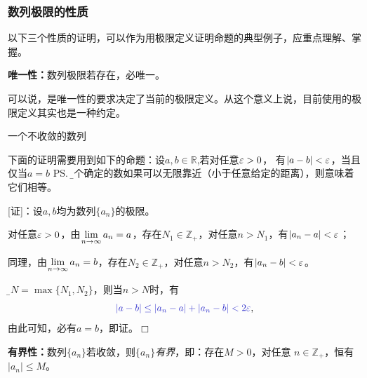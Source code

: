\subsubsection{数列极限的性质}

以下三个性质的证明，可以作为用极限定义证明命题的典型例子，应重点理解、掌握。

\begin{thx}
	{\bf 唯一性：}数列极限若存在，必唯一。
\end{thx}

可以说，是唯一性的要求决定了当前的极限定义。从这个意义上说，目前使用的极限定义其实也是一种约定。

\begin{center}
	
	一个不收敛的数列
\end{center}

下面的证明需要用到如下的命题：设$a,b\in\mathbb{R}$,若对任意$\varepsilon>0$，
有$|a-b|<\varepsilon$，当且仅当$a=b$
\ps{\b 两个确定的数如果可以无限靠近（小于任意给定的距离），则意味着它们相等。}

[证]：设$a,b$均为数列$\{a_n\}$的极限。

对任意$\varepsilon>0$，由$\lim\limits_{n\to\infty} a_n=a$，存在$N_1\in\mathbb{Z}_+$，对任意$n>N_1$，有$|a_n-a|<\varepsilon$；

同理，由$\lim\limits_{n\to\infty} a_n=b$，存在$N_2\in\mathbb{Z}_+$，对任意$n>N_2$，有$|a_n-b|<\varepsilon$。

令{\b $N=\max\{N_1,N_2\}$}，则当$n>N$时，有
$${\b |a-b|\leq|a_n-a|+|a_n-b|<2\e},$$
由此可知，必有$a=b$，即证。\hfill $\Box$

\begin{thx}
	{\bf 有界性：}数列$\{a_n\}$若收敛，则{\it $\{a_n\}$有界}，即：存在$M>0$，对任意
	$n\in\mathbb{Z}_+$，恒有$|a_n|\leq M$。	
\end{thx}

